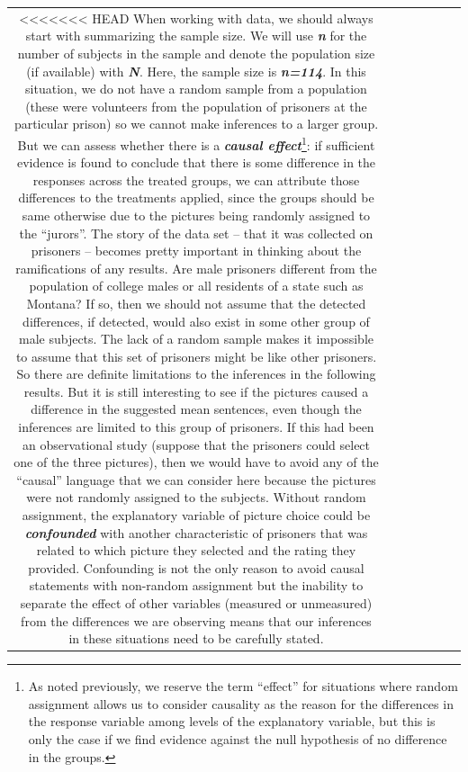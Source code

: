 \documentclass[]{book}
\let\rmarkdownfootnote\footnote%
\def\footnote{\protect\rmarkdownfootnote}
\theoremstyle{definition}
\theoremstyle{definition}
\theoremstyle{remark}
\begin{document}
\begin{longtable}[]{@{}ccccccc@{}}
\begin{minipage}[b]{0.10\columnwidth}
<<<<<<< HEAD
When working with data, we should always start with summarizing the
sample size. We will use \textbf{\emph{n}} for the number of subjects in
the sample and denote the population size (if available) with
\textbf{\emph{N}}. Here, the sample size is \textbf{\emph{n=114}}. In
this situation, we do not have a random sample from a population (these
were volunteers from the population of prisoners at the particular
prison) so we cannot make inferences to a larger group. But we can
assess whether there is a \textbf{\emph{causal effect}}\footnote{As
  noted previously, we reserve the term ``effect'' for situations where
  random assignment allows us to consider causality as the reason for
  the differences in the response variable among levels of the
  explanatory variable, but this is only the case if we find evidence
  against the null hypothesis of no difference in the groups.}: if
sufficient evidence is found to conclude that there is some difference
in the responses across the treated groups, we can attribute those
differences to the treatments applied, since the groups should be same
otherwise due to the pictures being randomly assigned to the ``jurors''.
The story of the data set -- that it was collected on prisoners --
becomes pretty important in thinking about the ramifications of any
results. Are male prisoners different from the population of college
males or all residents of a state such as Montana? If so, then we should
not assume that the detected differences, if detected, would also exist
in some other group of male subjects. The lack of a random sample makes
it impossible to assume that this set of prisoners might be like other
prisoners. So there are definite limitations to the inferences in the
following results. But it is still interesting to see if the pictures
caused a difference in the suggested mean sentences, even though the
inferences are limited to this group of prisoners. If this had been an
observational study (suppose that the prisoners could select one of the
three pictures), then we would have to avoid any of the ``causal''
language that we can consider here because the pictures were not
randomly assigned to the subjects. Without random assignment, the
explanatory variable of picture choice could be
\textbf{\emph{confounded}} with another characteristic of prisoners that
was related to which picture they selected and the rating they provided.
Confounding is not the only reason to avoid causal statements with
non-random assignment but the inability to separate the effect of other
variables (measured or unmeasured) from the differences we are observing
means that our inferences in these situations need to be carefully
stated.


\end{minipage}
\end{longtable}
\end{document}
